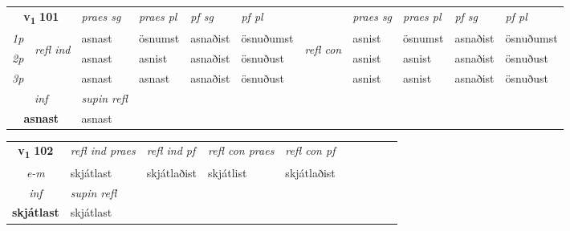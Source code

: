 \noindent
\noindent
\begin{tabular}{lllllllllll} \toprule
\multicolumn{2}{c}{\textbf{v{\textsubscript{1}}} \Large{\textbf{101}}}  &  \textit{praes sg}  & \textit{praes pl}  &\textit{ pf sg} & \textit{pf pl} &  &  \textit{praes sg}  & \textit{praes pl}  & \textit{pf sg} & \textit{pf pl } \\*
	\cmidrule{3-6} \cmidrule{8-11}
 {\textit{1p}} & \multirow{3}{*}{\begin{turn}{90}\textit{refl ind}\end{turn}}  & asnast & ösnumst & asnaðist & ösnuðumst & \multirow{3}{*}{\begin{turn}{90}\textit{refl con}\end{turn}}  &asnist & ösnumst & asnaðist & ösnuðumst \\*
 {\textit{2p}} &  & asnast & asnist & asnaðist & ösnuðust & &asnist & asnist & asnaðist & ösnuðust \\*
 {\textit{3p}}  & & asnast & asnast & asnaðist & ösnuðust & & asnist & asnist& asnaðist & ösnuðust \\*
\cmidrule{3-6} \cmidrule{8-11}

   \multicolumn{2}{c}{\textit{inf}}       & \textit{supin refl}  \\*
  \multicolumn{2}{c}{\textbf{asnast}}        & asnast  \\*
\end{tabular}

\noindent
\begin{tabular}{lllllllllll} \toprule
\multicolumn{2}{c}{\textbf{v{\textsubscript{1}}} \Large{\textbf{102}}}  & \textit{refl ind praes} & \textit{refl ind pf} & \textit{refl con praes} & \textit{refl con pf} \\*
 \multicolumn{2}{c}{ \textit{e-m} }& skjátlast & skjátlaðist & skjátlist & skjátlaðist \\*

\cmidrule{3-3}
   \multicolumn{2}{c}{\textit{inf}}       & \textit{supin refl}  \\*
  \multicolumn{2}{c}{\textbf{skjátlast}}        & skjátlast  \\*
\end{tabular}

